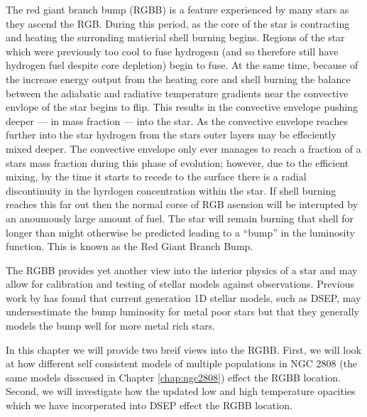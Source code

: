 The red giant branch bump (RGBB) is a feature experienced by many stars as they ascend the RGB. During this period, as the core of
the star is contracting and heating the surronding matierial shell burning
begins. Regions of the star which were previously too cool to fuse hydrogesn
(and so therefore still have hydrogen fuel despite core depletion) begin to
fuse. At the same time, because of the increase energy output from the heating
core and shell burning the balance between the adiabatic and radiative
temperature gradients near the convective envlope of the star begins to flip.
This results in the convective envelope pushing deeper --- in mass fraction --- into the star. As the
convective envelope reaches further into the star hydrogen from the stars outer
layers may be effeciently mixed deeper. The convective envelope only ever
manages to reach a fraction of a stars mass fraction during this phase of evolution;
however, due to the efficient mixing, by the time it starts to recede to the
surface there is a radial discontinuity in the hyrdogen concentration within
the star. If shell burning reaches this far out then the normal corse of RGB
asension will be interupted by an anoumously large amount of fuel. The star
will remain burning that shell for longer than might otherwise be predicted
leading to a ``bump'' in the luminosity function. This is known as the Red
Giant Branch Bump.

The RGBB provides yet another view into the interior physics of a star and may
allow for calibration and testing of stellar models against observations.
Previous work by \citet{Joyce2016} has found that current
generation 1D stellar models, such as DSEP, may undersestimate the bump
luminosity for metal poor stars but that they generally models the bump well
for more metal rich stars.

In this chapter we will provide two breif views into the RGBB. First, we will
look at how different self consistent models of multiple populations in NGC
2808 (the same models disscused in Chapter \ref{chap:ngc2808}) effect the
RGBB location. Second, we will investigate how the updated low and high
temperature opacities which we have incorperated into DSEP effect the RGBB
location.
